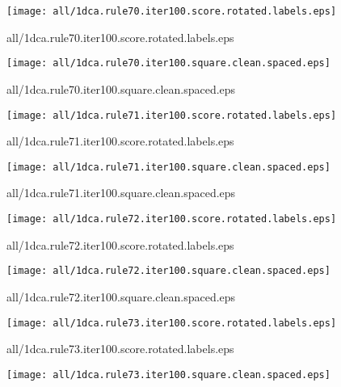 \documentclass{article}
\begin{document}
\begin{center}
\begin{minipage}{\textwidth}
\texttt{[image: all/1dca.rule70.iter100.score.rotated.labels.eps]}
\end{minipage}
\end{center}
{\footnotesize all/1dca.rule70.iter100.score.rotated.labels.eps}
\begin{center}
\begin{minipage}{\textwidth}
\texttt{[image: all/1dca.rule70.iter100.square.clean.spaced.eps]}
\end{minipage}
\end{center}
{\footnotesize all/1dca.rule70.iter100.square.clean.spaced.eps}
\begin{center}
\begin{minipage}{\textwidth}
\texttt{[image: all/1dca.rule71.iter100.score.rotated.labels.eps]}
\end{minipage}
\end{center}
{\footnotesize all/1dca.rule71.iter100.score.rotated.labels.eps}
\begin{center}
\begin{minipage}{\textwidth}
\texttt{[image: all/1dca.rule71.iter100.square.clean.spaced.eps]}
\end{minipage}
\end{center}
{\footnotesize all/1dca.rule71.iter100.square.clean.spaced.eps}
\begin{center}
\begin{minipage}{\textwidth}
\texttt{[image: all/1dca.rule72.iter100.score.rotated.labels.eps]}
\end{minipage}
\end{center}
{\footnotesize all/1dca.rule72.iter100.score.rotated.labels.eps}
\begin{center}
\begin{minipage}{\textwidth}
\texttt{[image: all/1dca.rule72.iter100.square.clean.spaced.eps]}
\end{minipage}
\end{center}
{\footnotesize all/1dca.rule72.iter100.square.clean.spaced.eps}
\begin{center}
\begin{minipage}{\textwidth}
\texttt{[image: all/1dca.rule73.iter100.score.rotated.labels.eps]}
\end{minipage}
\end{center}
{\footnotesize all/1dca.rule73.iter100.score.rotated.labels.eps}
\begin{center}
\begin{minipage}{\textwidth}
\texttt{[image: all/1dca.rule73.iter100.square.clean.spaced.eps]}
\end{minipage}
\end{center}
\end{document}
